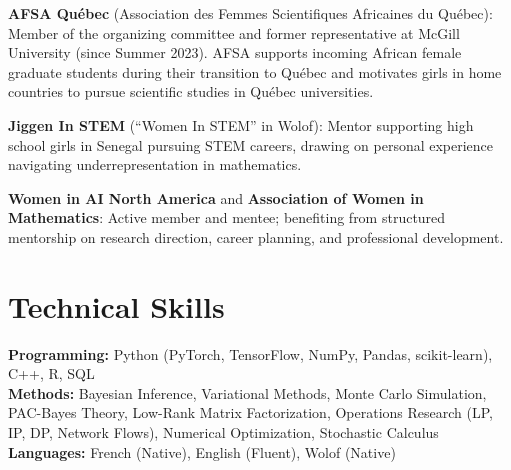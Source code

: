 \documentclass[10pt, a4paper]{article}
\newcommand{\skillgroup}[2]{
    \noindent\textbf{#1:} #2 \\
}
\begin{document}
{\small
\textbf{AFSA Qu\'ebec} (Association des Femmes Scientifiques Africaines du Qu\'ebec): Member of the organizing committee and former representative at McGill University (since Summer 2023). AFSA supports incoming African female graduate students during their transition to Qu\'ebec and motivates girls in home countries to pursue scientific studies in Qu\'ebec universities.

\vspace{0.2em}
\textbf{Jiggen In STEM} (``Women In STEM'' in Wolof): Mentor supporting high school girls in Senegal pursuing STEM careers, drawing on personal experience navigating underrepresentation in mathematics.

\vspace{0.2em}
\textbf{Women in AI North America} and \textbf{Association of Women in Mathematics}: Active member and mentee; benefiting from structured mentorship on research direction, career planning, and professional development.
}

\section{Technical Skills}
\vspace{0.2em}
\skillgroup{Programming}{Python (PyTorch, TensorFlow, NumPy, Pandas, scikit-learn), C++, R, SQL}
\skillgroup{Methods}{Bayesian Inference, Variational Methods, Monte Carlo Simulation, PAC-Bayes Theory, Low-Rank Matrix Factorization, Operations Research (LP, IP, DP, Network Flows), Numerical Optimization, Stochastic Calculus}
\skillgroup{Languages}{French (Native), English (Fluent), Wolof (Native)}
\end{document}
